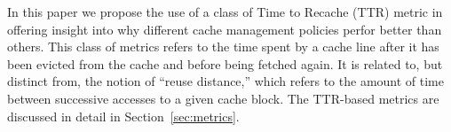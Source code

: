 In this paper we propose the use of a class of Time to Recache
(TTR) metric in offering insight into why different cache management
policies perfor better than others.  
This class of metrics refers to the time spent by a cache line after it has been
evicted from the cache and before being fetched again.  
It is related to, but distinct from, the notion of ``reuse distance,''
which refers to the amount of time between successive accesses to a
given cache block.
The TTR-based metrics are discussed in detail in
Section~\ref{sec:metrics}.

